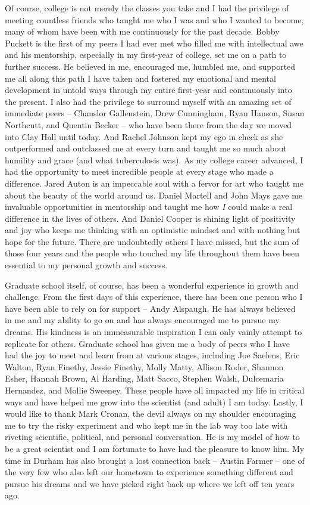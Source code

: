 \documentclass[PhD]{dukethesis2006}
\begin{document}
\begin{doublespace}
Of course, college is not merely the classes you take and I had the privilege of meeting countless friends who taught me who I was and who I wanted to become, many of whom have been with me continuously for the past decade. Bobby Puckett is the first of my peers I had ever met who filled me with intellectual awe and his mentorship, especially in my first-year of college, set me on a path to further success. He believed in me, encouraged me, humbled me, and supported me all along this path I have taken and fostered my emotional and mental development in untold ways through my entire first-year and continuously into the present. I also had the privilege to surround myself with an amazing set of immediate peers -- Chanslor Gallenstein, Drew Cunningham, Ryan Hanson, Susan Northcutt, and Quentin Becker -- who have been there from the day we moved into Clay Hall until today. And Rachel Johnson kept my ego in check as she outperformed and outclassed me at every turn and taught me so much about humility and grace (and what tuberculosis was). As my college career advanced, I had the opportunity to meet incredible people at every stage who made a difference. Jared Auton is an impeccable soul with a fervor for art who taught me about the beauty of the world around us. Daniel Martell and John Mays gave me invaluable opportunities in mentorship and taught me how \textit{I} could make a real difference in the lives of others. And Daniel Cooper is shining light of positivity and joy who keeps me thinking with an optimistic mindset and with nothing but hope for the future. There are undoubtedly others I have missed, but the sum of those four years and the people who touched my life throughout them have been essential to my personal growth and success.

Graduate school itself, of course, has been a wonderful experience in growth and challenge. From the first days of this experience, there has been one person who I have been able to rely on for support -- Andy Alspaugh. He has always believed in me and my ability to go on and has always encouraged me to pursue my dreams. His kindness is an immeasurable inspiration I can only vainly attempt to replicate for others. Graduate school has given me a body of peers who I have had the joy to meet and learn from at various stages, including Joe Saelens, Eric Walton, Ryan Finethy, Jessie Finethy, Molly Matty, Allison Roder, Shannon Esher, Hannah Brown, Al Harding, Matt Sacco, Stephen Walsh, Dulcemaria Hernandez, and Mollie Sweeney. These people have all impacted my life in critical ways and have helped me grow into the scientist (and adult) I am today. Lastly, I would like to thank Mark Cronan, the devil always on my shoulder encouraging me to try the risky experiment and who kept me in the lab way too late with riveting scientific, political, and personal conversation. He is my model of how to be a great scientist and I am fortunate to have had the pleasure to know him. My time in Durham has also brought a lost connection back -- Austin Farmer -- one of the very few who also left our hometown to experience something different and pursue his dreams and we have picked right back up where we left off ten years ago. 


\end{doublespace}
\end{document}
